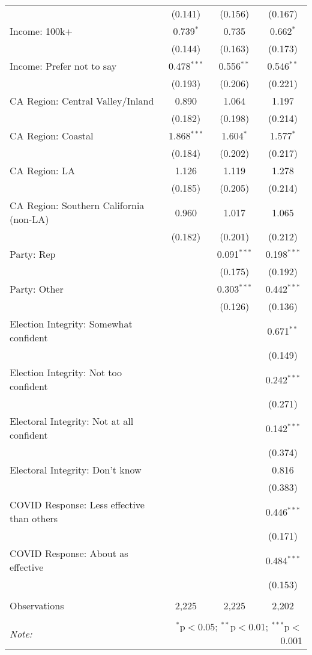 \begin{table}[!htbp]
\begin{tabular}{@{\extracolsep{5pt}}lccc}
  & (0.141) & (0.156) & (0.167) \\ 
  Income: 100k+ & 0.739$^{*}$ & 0.735 & 0.662$^{*}$ \\ 
  & (0.144) & (0.163) & (0.173) \\ 
  Income: Prefer not to say & 0.478$^{***}$ & 0.556$^{**}$ & 0.546$^{**}$ \\ 
  & (0.193) & (0.206) & (0.221) \\ 
  CA Region: Central Valley/Inland & 0.890 & 1.064 & 1.197 \\ 
  & (0.182) & (0.198) & (0.214) \\ 
  CA Region: Coastal & 1.868$^{***}$ & 1.604$^{*}$ & 1.577$^{*}$ \\ 
  & (0.184) & (0.202) & (0.217) \\ 
  CA Region: LA & 1.126 & 1.119 & 1.278 \\ 
  & (0.185) & (0.205) & (0.214) \\ 
  CA Region: Southern California (non-LA) & 0.960 & 1.017 & 1.065 \\ 
  & (0.182) & (0.201) & (0.212) \\ 
  Party: Rep &  & 0.091$^{***}$ & 0.198$^{***}$ \\ 
  &  & (0.175) & (0.192) \\ 
  Party: Other &  & 0.303$^{***}$ & 0.442$^{***}$ \\ 
  &  & (0.126) & (0.136) \\ 
  Election Integrity: Somewhat confident &  &  & 0.671$^{**}$ \\ 
  &  &  & (0.149) \\ 
  Election Integrity: Not too confident &  &  & 0.242$^{***}$ \\ 
  &  &  & (0.271) \\ 
  Electoral Integrity: Not at all confident &  &  & 0.142$^{***}$ \\ 
  &  &  & (0.374) \\ 
  Electoral Integrity: Don't know &  &  & 0.816 \\ 
  &  &  & (0.383) \\ 
  COVID Response: Less effective than others &  &  & 0.446$^{***}$ \\ 
  &  &  & (0.171) \\ 
  COVID Response: About as effective &  &  & 0.484$^{***}$ \\ 
  &  &  & (0.153) \\ 
 \hline \\[-1.8ex] 
Observations & 2,225 & 2,225 & 2,202 \\ 
\hline 
\hline \\[-1.8ex] 
\textit{Note:}  & \multicolumn{3}{r}{$^{*}$p$<$0.05; $^{**}$p$<$0.01; $^{***}$p$<$0.001} \\ 
\end{tabular} 
\end{table} 
